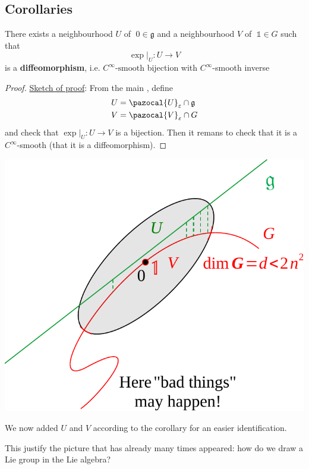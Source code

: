 \documentclass[../main.tex]{subfiles}
\begin{document}
\subsection{Corollaries}
\begin{corollary}
There exists a neighbourhood $U$ of $\;0\in\mathfrak{g}$ and a neighbourhood $V$ of $\;\mathbb{1}\in G$ such that
\[
\exp\big|_U:U\to V
\]
is a \textbf{diffeomorphism}, i.e. $C^\infty\textrm{-smooth}$ bijection with $C^\infty$-smooth inverse
\end{corollary}
\begin{proof}
\underline{Sketch of proof}: From the main , define
\[
\begin{split}
    U&=\pazocal{U}_\varepsilon\cap\mathfrak{g}\\
    V&=\pazocal{V}_\varepsilon\cap G
\end{split}
\]
and check that $\exp\big|_U:U\to V$ is a bijection. Then it remans to check that it is a $C^\infty$-smooth (that it is a diffeomorphism).
\end{proof}
\begin{marginfigure}[-10mm]
	\includegraphics[width=1\linewidth]{images/visualization_exp_G2.pdf}
	\caption[Visualization of the exponential map of $G$ of the corollary]{We now added $U$ and $V$ according to the corollary for an easier identification.}
\end{marginfigure}
This justify the picture that has already many times appeared: how do we draw a Lie group in the Lie algebra?
\end{document}
